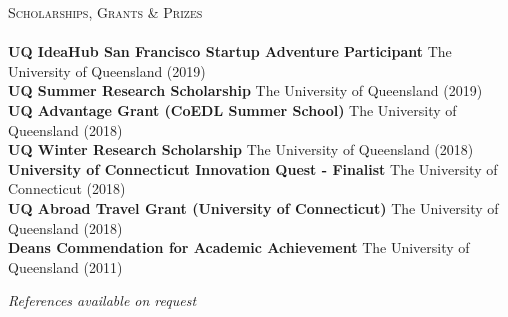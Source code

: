 \documentclass[a4paper]{article}
\newcommand{\lineunder} {
    \vspace*{-8pt} \\
    \hspace*{-10pt} \hrulefill \\
}
\newcommand{\header} [1] {
    {\hspace*{-10pt}\vspace*{6pt} \textsc{#1}}
    \vspace*{-6pt} \lineunder
}
\begin{document}
\header{Scholarships, Grants \& Prizes}
\textbf{UQ IdeaHub San Francisco Startup Adventure Participant} \hfill The University of Queensland (2019)\\
\textbf{UQ Summer Research Scholarship} \hfill The University of Queensland (2019)\\
\textbf{UQ Advantage Grant (CoEDL Summer School)} \hfill The University of Queensland (2018)\\
\textbf{UQ Winter Research Scholarship} \hfill The University of Queensland (2018)\\
\textbf{University of Connecticut Innovation Quest - Finalist} \hfill The University of Connecticut (2018)\\
\textbf{UQ Abroad Travel Grant (University of Connecticut)} \hfill The University of Queensland (2018)\\
\textbf{Dean\textquotesingle{}s Commendation for Academic Achievement} \hfill The University of Queensland (2011)\\


\vspace{3mm}
\begin{center}
\small \textit{References available on request}
\end{center}
\end{document}
